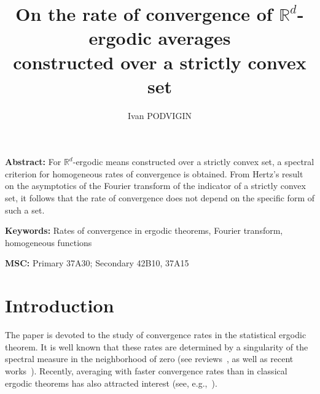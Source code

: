 \documentclass[12pt]{article}
\begin{document}
\title{On the rate of convergence of $\mathbb{R}^d$-ergodic averages \\ constructed over a strictly convex set}       %

\author{Ivan \uppercase{Podvigin}}             %
   


\maketitle%


{{\bf Abstract:} For $\mathbb{R}^d$-ergodic means constructed over a strictly convex set, a spectral criterion for homogeneous rates of convergence is obtained. From Hertz's result on the asymptotics of the Fourier transform of the indicator of a strictly convex set, it follows that the rate of convergence does not depend on the specific form of such a set.}

{{\bf Keywords:} Rates of convergence in ergodic theorems, Fourier transform, homogeneous functions}        %

{{\bf MSC:} Primary 37A30; Secondary 42B10, 37A15}      %


\section{Introduction} 
The paper is devoted to the study of convergence rates in the statistical ergodic theorem.
It is well known that these rates are determined by a singularity of the spectral measure in the neighborhood of zero (see reviews~\cite{Ka96, KaPo16}, as well as recent works~\cite{Tem22, Bras24}). Recently, averaging with faster convergence rates than in classical ergodic theorems has also attracted interest (see,  e.g.,~\cite{DY18,DM23,TongLi24,P24Ufa}).
\end{document}
